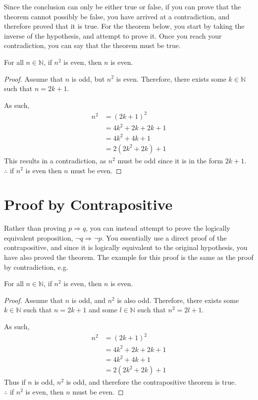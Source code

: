 Since the conclusion can only be either true or false, if you can prove that the theorem cannot possibly be false, you
 have arrived at a contradiction, and therefore proved that it is true. For the theorem below, you start by taking the
 inverse of the hypothesis, and attempt to prove it. Once you reach your contradiction, you can say that the theorem
 must be true.
\begin{theorem}
For all $n \in \mathbb{N}$, if $n^2$ is even, then $n$ is even.
\end{theorem}

\begin{proof}
Assume that $n$ is odd, but $n^2$ is even. Therefore, there exists some $k \in \mathbb{N}$ such that $n = 2k + 1$.

As such,
\begin{align*}
  n^2 & = (2k + 1)^2 \\
  & = 4k^2 + 2k + 2k + 1 \\
  & = 4k^2 + 4k + 1 \\
  & = 2(2k^2 + 2k) + 1
\end{align*}
This results in a contradiction, as $n^2$ must be odd since it is in the form $2k + 1$.\\
$\therefore$ if $n^2$ is even then $n$ must be even.
\end{proof}

\section*{Proof by Contrapositive}

Rather than proving $p \Rightarrow q$, you can instead attempt to prove the logically equivalent proposition,
 $\neg q \Rightarrow \neg p$. You essentially use a direct proof of the contrapositive, and since it is logically
 equivalent to the original hypothesis, you have also proved the theorem. The example for this proof is the same as the
 proof by contradiction, e.g.
\begin{theorem}
For all $n \in \mathbb{N}$, if $n^2$ is even, then $n$ is even.
\end{theorem}

\begin{proof}
Assume that $n$ is odd, and $n^2$ is also odd. Therefore, there exists some $k \in \mathbb{N}$ such that $n = 2k + 1$
 and some $l \in \mathbb{N}$ such that $n^2 = 2l + 1$.

As such,
\begin{align*}
  n^2 & = (2k + 1)^2 \\
  & = 4k^2 + 2k + 2k + 1 \\
  & = 4k^2 + 4k + 1 \\
  & = 2(2k^2 + 2k) + 1
\end{align*}
Thus if $n$ is odd, $n^2$ is odd, and therefore the contrapositive theorem is true.\\
$\therefore$ if $n^2$ is even, then $n$ must be even.
\end{proof}

